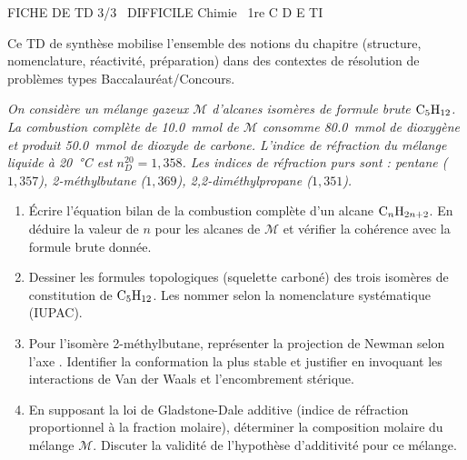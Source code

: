 \documentclass[11pt]{article}
\begin{document}
\begin{tcolorbox}[enhanced,colback=popink,colframe=popink,arc=10pt,boxrule=0pt,left=12pt,right=12pt,top=9pt,bottom=9pt]
{\color{white}\popxbold\small FICHE DE TD 3/3 \textbullet\ DIFFICILE \hfill Chimie \textbullet\ 1re C D E TI\par}
\end{tcolorbox}
\vspace{4pt}
Ce TD de synthèse mobilise l'ensemble des notions du chapitre (structure, nomenclature, réactivité, préparation) dans des contextes de résolution de problèmes types Baccalauréat/Concours.

\begin{exercice}
\emph{On considère un mélange gazeux $\mathcal{M}$ d'alcanes isomères de formule brute $\ce{C5H12}$. La combustion complète de \SI{10,0}{\milli\mol} de $\mathcal{M}$ consomme \SI{80,0}{\milli\mol} de dioxygène et produit \SI{50,0}{\milli\mol} de dioxyde de carbone. L'indice de réfraction du mélange liquide à \SI{20}{\celsius} est $n_D^{20} = 1,358$. Les indices de réfraction purs sont : pentane ($1,357$), 2-méthylbutane ($1,369$), 2,2-diméthylpropane ($1,351$).}
\begin{enumerate}
    \item Écrire l'équation bilan de la combustion complète d'un alcane $\ce{C_nH_{2n+2}}$. En déduire la valeur de $n$ pour les alcanes de $\mathcal{M}$ et vérifier la cohérence avec la formule brute donnée.
    \item Dessiner les formules topologiques (squelette carboné) des trois isomères de constitution de $\ce{C5H12}$. Les nommer selon la nomenclature systématique (IUPAC).
    \item Pour l'isomère 2-méthylbutane, représenter la projection de Newman selon l'axe . Identifier la conformation la plus stable et justifier en invoquant les interactions de Van der Waals et l'encombrement stérique.
    \item En supposant la loi de Gladstone-Dale additive (indice de réfraction proportionnel à la fraction molaire), déterminer la composition molaire du mélange $\mathcal{M}$. Discuter la validité de l'hypothèse d'additivité pour ce mélange.
\end{enumerate}
\end{exercice}
\end{document}
